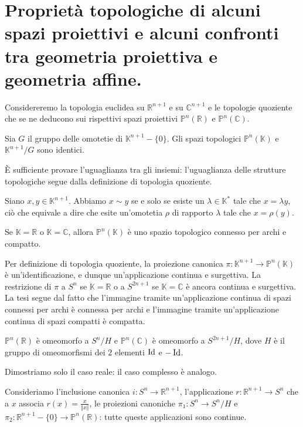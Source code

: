 \section{Propriet\`a topologiche di alcuni spazi proiettivi e alcuni confronti tra geometria proiettiva e geometria affine.}

	Considereremo la topologia euclidea su $\mathbb{R}^{n + 1}$ e su $\mathbb{C}^{n + 1}$ e le topologie quoziente che se ne deducono sui rispettivi spazi proiettivi $\mathbb{P}^n(\mathbb{R})$ e $\mathbb{P}^n(\mathbb{C})$.
\begin{Theorem}\label{thtop1}
	Sia $G$ il gruppo delle omotetie di $\mathbb{K}^{n + 1} - \lbrace 0 \rbrace$. Gli spazi topologici $\mathbb{P}^n(\mathbb{K})$ e $\mathbb{K}^{n + 1}/G$ sono identici.
\end{Theorem}
\Proof \`E sufficiente provare l'uguaglianza tra gli insiemi: l'uguaglianza delle strutture topologiche segue dalla definizione di topologia quoziente.
	\par Siano $x, y \in \mathbb{K}^{n + 1}$. Abbiamo $x \sim y$ se e solo se esiste un $\lambda \in \mathbb{K}^*$ tale che $x = \lambda y$, ci\`o che equivale a dire che esite un'omotetia $\rho$ di rapporto $\lambda$ tale che $x = \rho(y)$. \EndProof
\begin{Theorem}\label{thtop2}
	Se $\mathbb{K} = \mathbb{R}$ o $\mathbb{K} = \mathbb{C}$, allora $\mathbb{P}^n(\mathbb{K})$ \`e uno spazio topologico connesso per archi e compatto.
\end{Theorem}
\Proof Per definizione di topologia quoziente, la proiezione canonica $\pi: \mathbb{\mathbb{K}}^{n + 1} \rightarrow \mathbb{P}^n(\mathbb{K})$ \`e un'identificazione, e dunque un'applicazione continua e surgettiva. La restrizione di $\pi$ a $S^n$ se $\mathbb{K} = \mathbb{R}$ o a $S^{2n+1}$ se $\mathbb{K} = \mathbb{C}$ \`e ancora continua e surgettiva. La tesi segue dal fatto che l'immagine tramite un'applicazione continua di spazi connessi per archi \`e connessa per archi e l'immagine tramite un'applicazione continua di spazi compatti \`e compatta. \EndProof
\begin{Theorem}\label{thtop3}
	$\mathbb{P}^n(\mathbb{R})$ \`e omeomorfo a $S^n/H$ e $\mathbb{P}^n(\mathbb{C})$ \`e omeomorfo a $S^{2n + 1}/H$, dove $H$ \`e il gruppo di omeomorfismi dei $2$ elementi $\operatorname{Id}$ e $- \operatorname{Id}$.
\end{Theorem}
\Proof Dimostriamo solo il caso reale: il caso complesso \`e analogo.
	\par Consideriamo l'inclusione canonica $i: S^n \rightarrow \mathbb{R}^{n + 1}$, l'applicazione $r: \mathbb{R}^{n + 1} \rightarrow S^n$ che a $x$ associa $r(x) = \frac{x}{\Vert x \Vert}$, le proiezioni canoniche $\pi_1: S^n \rightarrow S^n/H$ e $\pi_2: \mathbb{R}^{n + 1} - \lbrace 0 \rbrace \rightarrow \mathbb{P}^n(\mathbb{R})$: tutte queste applicazioni sono continue.
